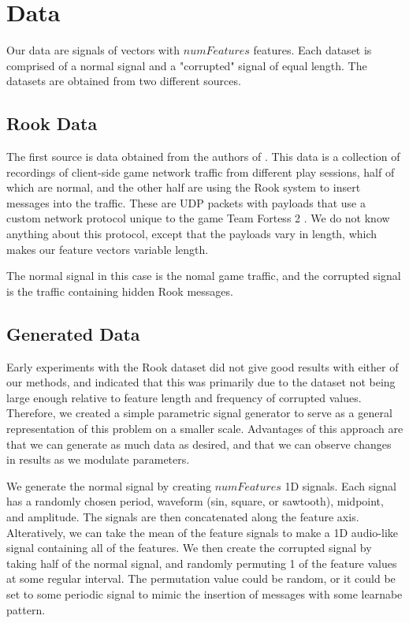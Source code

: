 \documentclass{acm_proc_article-sp}
\begin{document}
  \section{Data}
  \label{sec:data}

  Our data are signals of vectors with \(numFeatures\) features. Each dataset is comprised of a normal signal and a "corrupted" signal of equal length. The datasets are obtained from two different sources.
  
  \subsection{Rook Data}
  \label{subsec:rookdata}

  The first source is data obtained from the authors of \cite{vines2015rook}. This data is a collection of recordings of client-side game network traffic from different play sessions, half of which are normal, and the other half are using the Rook system to insert messages into the traffic. These are UDP packets with payloads that use a custom network protocol unique to the game Team Fortess 2 \cite{TF2}. We do not know anything about this protocol, except that the payloads vary in length, which makes our feature vectors variable length.

  The normal signal in this case is the nomal game traffic, and the corrupted signal is the traffic containing hidden Rook messages.

  \subsection{Generated Data}
  \label{subsec:generateddata}

  Early experiments with the Rook dataset did not give good results with either of our methods, and indicated that this was primarily due to the dataset not being large enough relative to feature length and frequency of corrupted values. Therefore, we created a simple parametric signal generator to serve as a general representation of this problem on a smaller scale. Advantages of this approach are that we can generate as much data as desired, and that we can observe changes in results as we modulate parameters.

  We generate the normal signal by creating \(numFeatures\) 1D signals. Each signal has a randomly chosen period, waveform (sin, square, or sawtooth), midpoint, and amplitude. The signals are then concatenated along the feature axis. Alteratively, we can take the mean of the feature signals to make a 1D audio-like signal containing all of the features. We then create the corrupted signal by taking half of the normal signal, and randomly permuting 1 of the feature values at some regular interval. The permutation value could be random, or it could be set to some periodic signal to mimic the insertion of messages with some learnabe pattern.
\end{document}
